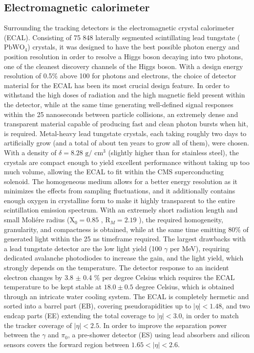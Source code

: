 \subsection{Electromagnetic calorimeter}
Surrounding the tracking detectors is the electromagnetic crystal calorimeter (ECAL). Consisting of 75 848 laterally segmented scintillating lead tungstate ($\textrm{PbWO}_4$) crystals, it was designed to have the best possible photon energy and position resolution in order to resolve a Higgs boson decaying into two photons, one of the cleanest discovery channels of the Higgs boson. 
With a design energy resolution of 0.5\% above 100 \GeV for photons and electrons, the choice of detector material for the ECAL has been its most crucial design feature. 
In order to withstand the high doses of radiation and the high magnetic field present within the detector, while at the same time generating well-defined signal responses within the 25 nanoseconds between particle collisions, an extremely dense and transparent material capable of producing fast and clean photon bursts when hit, is required. 
Metal-heavy lead tungstate crystals, each taking roughly two days to artificially grow (and a total of about ten years to grow all of them), were chosen. With a density of $\delta=8.28 \textrm{ g}/\textrm{ cm}^3$ (slightly higher than for stainless steel), the crystals are compact enough to yield excellent performance without taking up too much volume, allowing the ECAL to fit within the CMS superconducting solenoid. The homogeneous medium allows for a better energy resolution as it minimizes the effects from sampling fluctuations, and it additionally contains enough oxygen in crystalline form to make it highly transparent to the entire scintillation emission spectrum. With an extremely short radiation length and small Moliére radius ($\textrm{X}_0=0.85$ \cm, $\textrm{R}_M=2.19$ \cm), the required homogeneity, granularity, and compactness is obtained, while at the same time emitting 80\% of generated light within the 25 ns timeframe required. The largest drawbacks with a lead tungstate detector are the low light yield (100 $\gamma$ per MeV), requiring dedicated avalanche photodiodes to increase the gain, and the light yield, which strongly depends on the temperature. The detector response to an
incident electron changes by 3.8 $\pm$ 0.4 \% per degree Celsius which requires the ECAL temperature to be kept stable at $18.0 \pm 0.5$ degree Celsius, which is obtained through an intricate water cooling system.
The ECAL is completely hermetic and sorted into a barrel part (EB), covering pseudorapidities up to $|\eta|<1.48$, and two endcap parts (EE) extending the total coverage to $|\eta|<3.0$, in order to match the tracker coverage of $|\eta|<2.5$. In order to improve the separation power between the $\gamma$ and $\pi_0$, a pre-shower detector (ES) using lead absorbers and silicon sensors covers the forward region between $1.65<|\eta|<2.6$.
